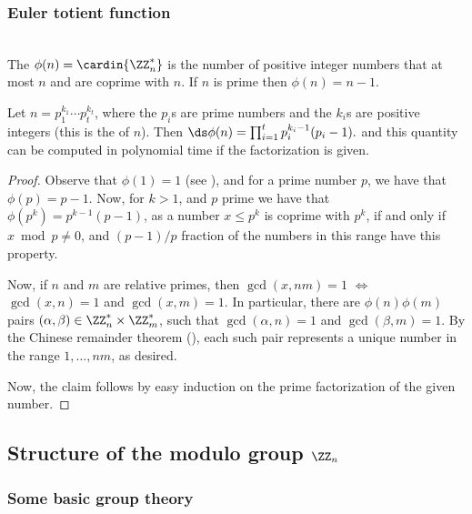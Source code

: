 \subsubsection{Euler totient function}
%
\mbox{}\\
The  $\phi(n) = \cardin{\ZZ_n^*}$ is the
number of positive integer numbers that at most $n$ and are
coprime with $n$. If $n$ is prime then $\phi(n)=n-1$.

\begin{lemma}
    Let $n=p_1^{k_1} \cdots p_t^{k_t}$, where the $p_i$s are prime
    numbers and the $k_i$s are positive integers (this is the
     of $n$). Then 
    \begin{math}
        \ds \phi(n) = \prod_{i=1}^t p_{i}^{k_i -1} (p_{i} -1).
    \end{math}
    and this quantity can be computed in polynomial time if the
    factorization is given.
\end{lemma}
\begin{proof}
    Observe that $\phi(1) = 1$ (see ), and for a prime
    number $p$, we have that $\phi(p) = p-1$. Now, for $k > 1$, and
    $p$ prime we have that $\phi(p^k) = p^{k-1} (p-1)$, as a number $x
    \leq p^k$ is coprime with $p^k$, if and only if $x \bmod p \neq
    0$, and $(p-1)/p$ fraction of the numbers in this range have this
    property.
    
    Now, if $n$ and $m$ are relative primes, then $\gcd(x,nm) =1$
    $\iff$ $\gcd(x,n) =1$ and $\gcd(x,m)=1$. In particular, there are
    $\phi(n)\phi(m)$ pairs $(\alpha, \beta)\in \ZZ_n^* \times
    \ZZ_m^*$, such that $\gcd(\alpha, n )=1$ and $\gcd(\beta, m
    )=1$. By the Chinese remainder theorem
    (), each such pair represents a unique
    number in the range $1,\ldots, nm$, as desired.

    Now, the claim follows by easy induction on the prime
    factorization of the given number.
\end{proof}


\subsection{Structure of the modulo group $\ZZ_n$}
\subsubsection{Some basic group theory}


